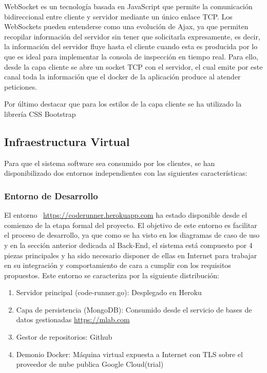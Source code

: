 \documentclass[a4paper,11pt]{book}
\begin{document}
WebSocket es un tecnología basada en JavaScript que permite la comunicación bidireccional entre cliente y servidor mediante un único enlace TCP. Los WebSockets pueden entenderse como una evolución de Ajax, ya que permiten recopilar información del servidor sin tener que solicitarla expresamente, es decir, la información del servidor fluye hasta el cliente cuando esta es producida por lo que es ideal para implementar la consola de inspección en tiempo real. Para ello, desde la capa cliente se abre un socket TCP con el servidor, el cual emite por este canal toda la información que el docker de la aplicación produce al atender peticiones.  

Por último destacar que para los estilos de la capa cliente se ha utilizado la librería CSS Bootstrap~\cite{boot}

\subsection{Infraestructura Virtual}\label{iv}

Para que el sistema software sea consumido por los clientes, se han disponibilizado dos entornos independientes con las siguientes características:

\subsubsection{Entorno de Desarrollo}

El entorno  ~\url{https://coderunner.herokuapp.com} ha estado disponible desde el comienzo de la etapa formal del proyecto. El objetivo de este entorno es facilitar el proceso de desarrollo, ya que  como se ha visto en los diagramas de caso de uso y en la sección anterior dedicada al Back-End, el sistema está compuesto por 4 piezas principales y ha sido necesario disponer de ellas en Internet para trabajar en su integración y comportamiento de cara a cumplir con los requisitos propuestos. Este entorno se caracteriza por la siguiente distribución: 


\begin{enumerate}
\item Servidor principal (code-runner.go): Desplegado en Heroku~\cite{hero}
\item Capa de persistencia (MongoDB): Consumido desde el servicio de bases de datos gestionadas \url{https://mlab.com}
\item Gestor de repositorios: Github~\cite{github}
\item Demonio Docker: Máquina virtual expuesta a Internet con TLS sobre el proveedor de nube publica Google Cloud(trial)~\cite{gcp}
\end{enumerate}
\end{document}
